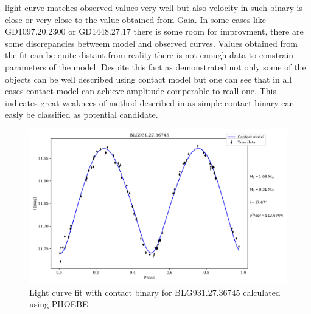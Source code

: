 \documentclass{pracalicmgr}
\begin{document}
light curve matches observed values very well but also velocity in such binary is close or very close to the value obtained from Gaia.
In some cases like GD1097.20.2300 or GD1448.27.17 there is some room for improvment, there are some discrepancies betweem model
and observed curves. Values obtained from the fit can be quite distant from reality there is not enough data to constrain parameters of the model.
Despite this fact as demonstrated not only some of the objects can be well described using contact model but one can see that
in all cases contact model can achieve amplitude comperable to reall one. This indicates great weaknees of method described
in \citet{gomel_search_2021-2} as simple contact binary can easly be classified as potential candidate.
 
\begin{figure}
    \centering
    \includegraphics[scale=0.6]{plots/modeling_phoebe_contact_BLG931.27.36745.jpg}
    \caption{Light curve fit with contact binary for BLG931.27.36745 calculated using PHOEBE.}\label{lc_plot}
\end{figure}
\end{document}
